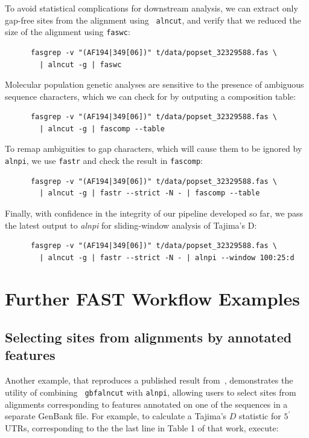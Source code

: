 \documentclass{frontiersSCNS} %
\newcommand{\fp}{$5^\prime${ }}
\begin{document}
\noindent To avoid statistical complications for downstream analysis,
we can extract only gap-free sites from the alignment using {\tt
  alncut}, and verify that we reduced the size of the alignment using
{\tt faswc}:

\begin{verbatim}
      fasgrep -v "(AF194|349[06])" t/data/popset_32329588.fas \
        | alncut -g | faswc
\end{verbatim}

\noindent Molecular population genetic analyses are sensitive to the
presence of ambiguous sequence characters, which we can check for by
outputing a composition table:
 
\begin{verbatim}
      fasgrep -v "(AF194|349[06])" t/data/popset_32329588.fas \ 
        | alncut -g | fascomp --table
\end{verbatim}

\noindent To remap ambiguities to gap characters, which will cause
them to be ignored by {\tt alnpi}, we use {\tt fastr} and check the
result in {\tt fascomp}:
 
\begin{verbatim}
      fasgrep -v "(AF194|349[06])" t/data/popset_32329588.fas \
        | alncut -g | fastr --strict -N - | fascomp --table
\end{verbatim}

\noindent Finally, with confidence in the integrity of our pipeline
developed so far, we pass the latest output to {\it alnpi} for
sliding-window analysis of Tajima's D:
 
\begin{verbatim}
      fasgrep -v "(AF194|349[06])" t/data/popset_32329588.fas \ 
        | alncut -g | fastr --strict -N - | alnpi --window 100:25:d
\end{verbatim}

\section{Further FAST Workflow Examples}

\subsection{Selecting sites from alignments by annotated features }

Another example, that reproduces a published result
from~\citep{Ardell03}, demonstrates the utility of combining {\tt
  gbfalncut} with {\tt alnpi}, allowing users to select sites from
alignments corresponding to features annotated on one of the sequences
in a separate GenBank file. For example, to calculate a Tajima's $D$
statistic for \fp UTRs, corresponding to the the last line in Table 1
of that work, execute:
\end{document}
